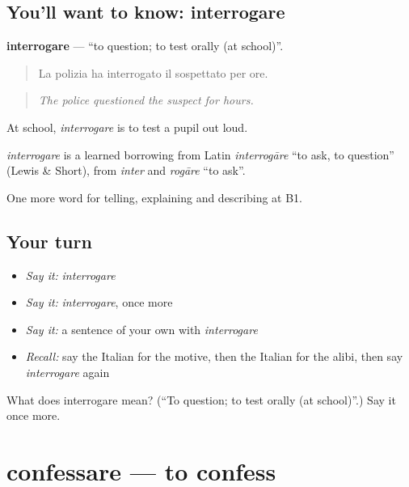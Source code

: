 \subsection*{You'll want to know: interrogare}
\textbf{interrogare} — \textquotedblleft{}to question; to test orally (at school)\textquotedblright{}.

\begin{quote}
La polizia ha interrogato il sospettato per ore.
\end{quote}

\begin{quote}
\emph{The police questioned the suspect for hours.}
\end{quote}

At school, \emph{interrogare} is to test a pupil out loud.

\begin{cousinweb}
\emph{interrogare} is a learned borrowing from Latin \emph{interrogāre} \textquotedblleft{}to ask, to question\textquotedblright{} (Lewis \& Short), from \emph{inter} and \emph{rogāre} \textquotedblleft{}to ask\textquotedblright{}.
\end{cousinweb}

\begin{grammarlens}[title={What you've built}]
One more word for telling, explaining and describing at B1.
\end{grammarlens}

\subsection*{Your turn}
\begin{itemize}
\raggedright
  \item \emph{Say it:} \emph{interrogare}
  \item \emph{Say it:} \emph{interrogare}, once more
  \item \emph{Say it:} a sentence of your own with \emph{interrogare}
  \item \emph{Recall:} say the Italian for the motive, then the Italian for the alibi, then say \emph{interrogare} again
\end{itemize}

\begin{tcolorbox}[breakable,colback=teal!4,colframe=teal!35!black,title={Before you move on}]
What does interrogare mean? (\textquotedblleft{}To question; to test orally (at school)\textquotedblright{}.) Say it once more.
\end{tcolorbox}
\section[confessare]{confessare — to confess}

